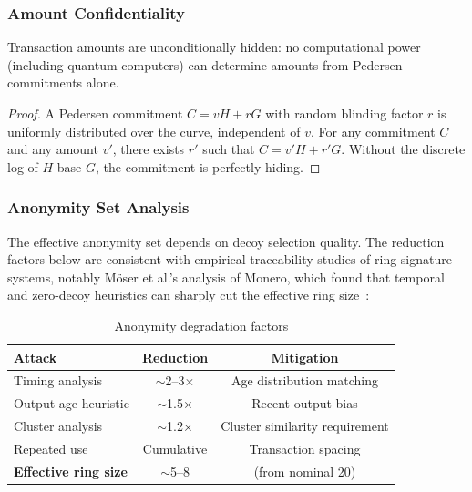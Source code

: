 \subsubsection{Amount Confidentiality}

\begin{theorem}
Transaction amounts are unconditionally hidden: no computational power
(including quantum computers) can determine amounts from Pedersen
commitments alone.
\end{theorem}

\begin{proof}
A Pedersen commitment $C = vH + rG$ with random blinding factor $r$ is
uniformly distributed over the curve, independent of $v$. For any
commitment $C$ and any amount $v'$, there exists $r'$ such that
$C = v'H + r'G$. Without the discrete log of $H$ base $G$, the commitment
is perfectly hiding.
\end{proof}

\subsubsection{Anonymity Set Analysis}

The effective anonymity set depends on decoy selection quality. The reduction
factors below are consistent with empirical traceability studies of
ring-signature systems, notably Möser et al.'s analysis of Monero, which
found that temporal and zero-decoy heuristics can sharply cut the effective
ring size~\cite{monerotracing}:

\begin{table}[h]
\centering
\caption{Anonymity degradation factors}
\label{tab:anonymity}
\begin{tabular}{@{}lcc@{}}
\toprule
\textbf{Attack} & \textbf{Reduction} & \textbf{Mitigation} \\
\midrule
Timing analysis & $\sim$2--3$\times$ & Age distribution matching \\
Output age heuristic & $\sim$1.5$\times$ & Recent output bias \\
Cluster analysis & $\sim$1.2$\times$ & Cluster similarity requirement \\
Repeated use & Cumulative & Transaction spacing \\
\midrule
\textbf{Effective ring size} & $\sim$5--8 & (from nominal 20) \\
\bottomrule
\end{tabular}
\end{table}

